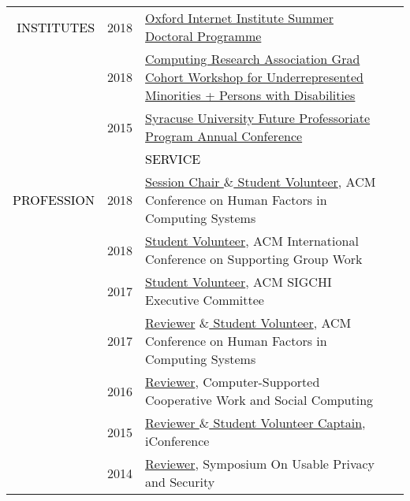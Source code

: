 \documentclass[12pt]{article}
\begin{document}
{{\begin{longtable}{Rp{1.0in}p{0.25in}p{4.75in}}
\textcolor{black}{\footnotesize{\uppercase{Institutes}}} & \footnotesize{2018} & \href{https://www.oii.ox.ac.uk/study/summer-doctoral-programme/}{{Oxford Internet Institute Summer Doctoral Programme}} \\

& \footnotesize{2018} & \href{https://cra.org/events/urmgradcohort/}{{Computing Research Association Grad Cohort Workshop for Underrepresented Minorities + Persons with Disabilities}} \\

& \footnotesize{2015} & \href{http://graduateschool.syr.edu/programs/future-professoriate-program/}{{Syracuse University Future Professoriate Program Annual Conference}} \bigskip \\

&&\par \Large \textcolor{black}{\uppercase{Service}}\\ \hhline{~~-}

\textcolor{black}{\footnotesize{\uppercase{Profession}}} & \footnotesize{2018} & \href{https://chi2018.acm.org}{{Session Chair $\&$  Student Volunteer}}, ACM Conference on Human Factors in Computing Systems \\

& \footnotesize{2018} & \href{http://group.acm.org/conferences/group18/index.html}{{Student Volunteer}}, ACM International Conference on Supporting Group Work \\

& \footnotesize{2017} & \href{https://sigchi.org/}{{Student Volunteer}}, ACM SIGCHI Executive Committee \\

& \footnotesize{2017} & \href{https://chi2017.acm.org/}{{Reviewer}} \href{http://ischools.org/the-iconference/}{{$\&$  Student Volunteer}}, ACM Conference on Human Factors in Computing Systems \\

& \footnotesize{2016} & \href{https://cscw.acm.org/}{{Reviewer}}, Computer-Supported Cooperative Work and Social Computing \\

& \footnotesize{2015} & \href{http://ischools.org/the-iconference/}{{Reviewer $\&$  Student Volunteer Captain}}, iConference \\

& \footnotesize{2014} & \href{https://www.usenix.org/sites/default/files/soups14_proceedings.pdf}{{Reviewer}}, Symposium On Usable Privacy and Security \\


\end{longtable}}}
\end{document}
